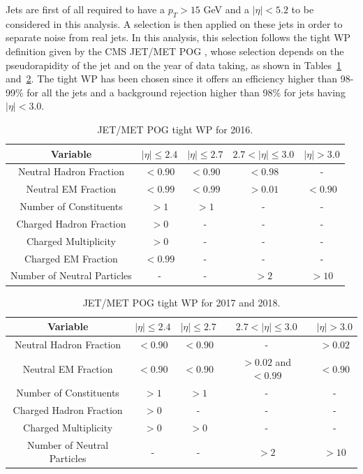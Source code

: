 \documentclass[a4paper, 10pt, openright]{report}
\begin{document}
Jets are first of all required to have a $p_T > 15$ GeV and a $|\eta| < 5.2$ to be considered in this analysis. A selection is then applied on these jets in order to separate noise from real jets. In this analysis, this selection follows the tight \ac{WP} definition given by the \ac{CMS} JET/MET \ac{POG} \cite{JETMETPOG}, whose selection depends on the pseudorapidity of the jet and on the year of data taking, as shown in Tables~\ref{table:JetID2016} and~\ref{table:JetID2017}. The tight \ac{WP} has been chosen since it offers an efficiency higher than 98-99\% for all the jets and a background rejection higher than 98\% for jets having $|\eta| < 3.0$.

\begin{table}
\begin{center}
\begin{tabular}{ c|c|c|c|c } 
 \hline
 Variable & $|\eta| \leq 2.4$ & $|\eta| \leq 2.7$ & $2.7 < |\eta| \leq 3.0$ & $|\eta| > 3.0$ \\
\hline
Neutral Hadron Fraction & $< 0.90$ & $< 0.90$ & $< 0.98$ & - \\
Neutral EM Fraction & $< 0.99$ & $< 0.99$ & $> 0.01$ & $< 0.90$ \\ 
Number of Constituents & $> 1$ & $> 1$ & - & - \\
Charged Hadron Fraction & $> 0$ & - & - & - \\
Charged Multiplicity & $> 0$ & - & - & - \\
Charged EM Fraction & $< 0.99$ & - & - & - \\
Number of Neutral Particles	 & - & - & $> 2$ & $> 10$ \\
\hline
\end{tabular}
\caption{JET/MET \ac{POG} tight \ac{WP} for 2016.}
\label{table:JetID2016}
\end{center}
\end{table}

\begin{table}
\begin{center}
\begin{tabular}{ c|c|c|c|c } 
 \hline
 Variable & $|\eta| \leq 2.4$ & $|\eta| \leq 2.7$ & $2.7 < |\eta| \leq 3.0$ & $|\eta| > 3.0$ \\
\hline
Neutral Hadron Fraction & $< 0.90$ & $< 0.90$ & - & $> 0.02$ \\
Neutral EM Fraction & $< 0.90$ & $< 0.90$ & $> 0.02$ and $<0.99$ & $< 0.90$ \\
Number of Constituents & $> 1$ & $> 1$ & - & - \\
Charged Hadron Fraction & $> 0$ & - & - & - \\
Charged Multiplicity & $> 0$ & $> 0$ & - & - \\
Number of Neutral Particles & - & - & $> 2$ & $> 10$ \\
\hline
\end{tabular}
\caption{JET/MET \ac{POG} tight \ac{WP} for 2017 and 2018.}
\label{table:JetID2017}
\end{center}
\end{table}
\end{document}

